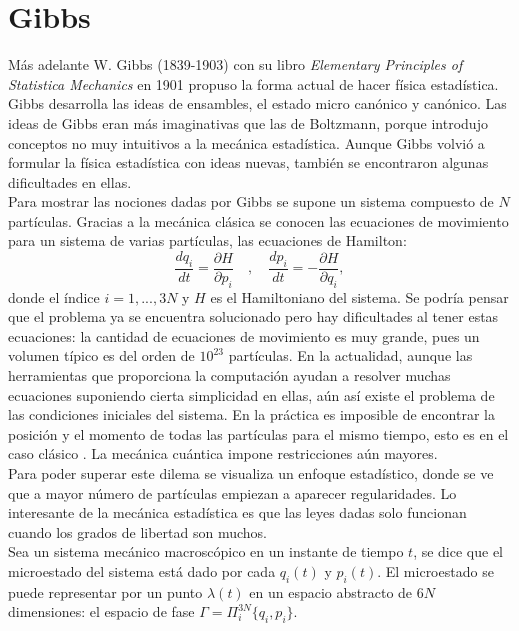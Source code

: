 \section{Gibbs}
Más adelante W. Gibbs (1839-1903) con su libro \textit{Elementary Principles of Statistica Mechanics} en 1901 propuso la forma actual de hacer física estadística. Gibbs desarrolla las ideas de ensambles, el estado micro canónico y canónico. Las ideas de Gibbs eran más imaginativas que las de Boltzmann, porque introdujo conceptos no muy intuitivos a la mecánica estadística. Aunque Gibbs volvió a formular la física estadística con ideas nuevas, también se encontraron algunas dificultades en ellas. \\
Para mostrar las nociones dadas por Gibbs se supone un sistema compuesto de $N$ partículas. Gracias a la mecánica clásica se conocen las ecuaciones de movimiento para un sistema de varias partículas, las ecuaciones de Hamilton:
\begin{equation} \label{Hamilton}
\frac{dq_{i}}{dt}= \frac{\partial H}{\partial p_{i}} \quad , \quad \frac{d p_{i}}{dt} =-\frac{\partial H}{\partial q_{i}},
\end{equation}
donde el índice $i=1,...,3N$ y $H$ es el Hamiltoniano del sistema. Se podría pensar que el problema ya se encuentra solucionado pero hay dificultades al tener estas ecuaciones: la cantidad de ecuaciones de movimiento es muy grande, pues un volumen típico es del orden de $10^{23}$ partículas. En la actualidad, aunque las herramientas que proporciona la computación ayudan a resolver muchas ecuaciones suponiendo cierta simplicidad en ellas, aún así existe el problema de las condiciones iniciales del sistema. En la práctica es imposible de encontrar la posición y el momento de todas las partículas para el mismo tiempo, esto es en el caso clásico \cite{LandauStat}. La mecánica cuántica impone restricciones aún mayores.
\\
Para poder superar este dilema se visualiza un enfoque estadístico, donde se ve que a mayor número de partículas empiezan a aparecer regularidades. Lo interesante de la mecánica estadística es que las leyes dadas solo funcionan cuando los grados de libertad son muchos.
\\
Sea un sistema mecánico macroscópico en un instante de tiempo $t$, se dice que el microestado del sistema está dado por cada $q_{i}(t)$ y $p_{i}(t)$. El microestado se puede representar por un punto $\lambda(t)$ en un espacio  abstracto de $6N$ dimensiones: el espacio de fase $\Gamma = \Pi^{3N}_{i} \{q_{i}, p_{i} \}$.
